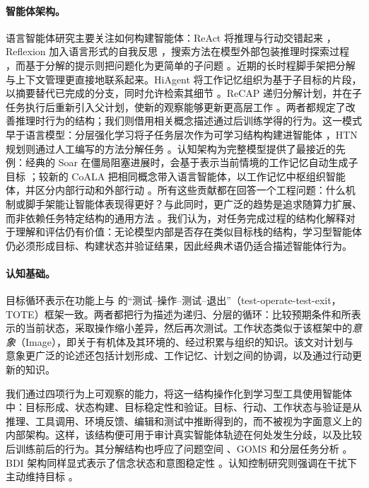 \documentclass[10pt]{article}
\begin{document}
\paragraph{智能体架构。}
语言智能体研究主要关注如何构建智能体：ReAct 将推理与行动交错起来 \citep{yao2023react}，Reflexion 加入语言形式的自我反思 \citep{shinn2023reflexion}，搜索方法在模型外部包装推理时探索过程 \citep{yao2023tot, zhou2024lats}，而基于分解的提示则把问题化为更简单的子问题 \citep{zhou2022least, prasad2024adapt}。近期的长时程脚手架把分解与上下文管理更直接地联系起来。HiAgent 将工作记忆组织为基于子目标的片段，以摘要替代已完成的分支，同时允许检索其细节 \citep{hu2025hiagent}。ReCAP 递归分解计划，并在子任务执行后重新引入父计划，使新的观察能够更新更高层工作 \citep{zhang2025recap}。两者都规定了改善推理时行为的结构；我们则借用相关概念描述通过后训练学得的行为。这一模式早于语言模型：分层强化学习将子任务层次作为可学习结构构建进智能体 \citep{sutton1999options, dietterich2000maxq}，HTN 规划则通过人工编写的方法分解任务 \citep{ghallab2004automated}。认知架构为完整模型提供了最接近的先例：经典的 Soar 在僵局阻塞进展时，会基于表示当前情境的工作记忆自动生成子目标 \citep{laird1987soar}；较新的 CoALA 把相同概念带入语言智能体，以工作记忆中枢组织智能体，并区分内部行动和外部行动 \citep{sumers2024coala}。所有这些贡献都在回答一个工程问题：什么机制或脚手架能让智能体表现得更好？与此同时，更广泛的趋势是追求随算力扩展、而非依赖任务特定结构的通用方法 \citep{sutton2019bitter}。我们认为，对任务完成过程的结构化解释对于理解和评估仍有价值：无论模型内部是否存在类似目标栈的结构，学习型智能体仍必须形成目标、构建状态并验证结果，因此经典术语仍适合描述智能体行为。

\paragraph{认知基础。}
目标循环表示在功能上与 \citet{miller1960plans} 的“测试--操作--测试--退出”（test-operate-test-exit，TOTE）框架一致。两者都把行为描述为递归、分层的循环：比较预期条件和所表示的当前状态，采取操作缩小差异，然后再次测试。工作状态类似于该框架中的\emph{意象}（Image），即关于有机体及其环境的、经过积累与组织的知识。该文对计划与意象更广泛的论述还包括计划形成、工作记忆、计划之间的协调，以及通过行动更新的知识。

我们通过四项行为上可观察的能力，将这一结构操作化到学习型工具使用智能体中：目标形成、状态构建、目标稳定性和验证。目标、行动、工作状态与验证是从推理、工具调用、环境反馈、编辑和测试中推断得到的，而不被视为字面意义上的内部架构。这样，该结构便可用于审计真实智能体轨迹在何处发生分歧，以及比较后训练前后的行为。其分解结构也呼应了问题空间 \citep{newell1972human}、GOMS \citep{card1983psychology} 和分层任务分析 \citep{annett1967task}。BDI 架构同样显式表示了信念状态和意图稳定性 \citep{bratman1987intention, rao1995bdi}。认知控制研究则强调在干扰下主动维持目标 \citep{miller2001integrative, duncan2012goalneglect}。
\end{document}

